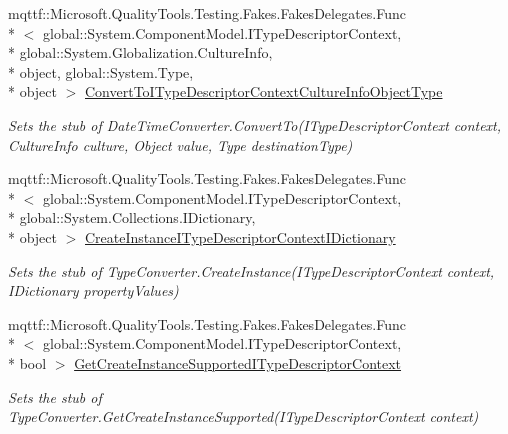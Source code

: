 \begin{DoxyCompactItemize}
mqttf\-::\-Microsoft.\-Quality\-Tools.\-Testing.\-Fakes.\-Fakes\-Delegates.\-Func\\*
$<$ global\-::\-System.\-Component\-Model.\-I\-Type\-Descriptor\-Context, \\*
global\-::\-System.\-Globalization.\-Culture\-Info, \\*
object, global\-::\-System.\-Type, \\*
object $>$ \hyperlink{class_system_1_1_component_model_1_1_fakes_1_1_stub_date_time_converter_a937aa8a7ee9f62cd32cdd3403766e67e}{Convert\-To\-I\-Type\-Descriptor\-Context\-Culture\-Info\-Object\-Type}
\begin{DoxyCompactList}\small\item\em Sets the stub of Date\-Time\-Converter.\-Convert\-To(\-I\-Type\-Descriptor\-Context context, Culture\-Info culture, Object value, Type destination\-Type)\end{DoxyCompactList}\item 
mqttf\-::\-Microsoft.\-Quality\-Tools.\-Testing.\-Fakes.\-Fakes\-Delegates.\-Func\\*
$<$ global\-::\-System.\-Component\-Model.\-I\-Type\-Descriptor\-Context, \\*
global\-::\-System.\-Collections.\-I\-Dictionary, \\*
object $>$ \hyperlink{class_system_1_1_component_model_1_1_fakes_1_1_stub_date_time_converter_aa9df84235bd62164c15cdaead8dda56f}{Create\-Instance\-I\-Type\-Descriptor\-Context\-I\-Dictionary}
\begin{DoxyCompactList}\small\item\em Sets the stub of Type\-Converter.\-Create\-Instance(\-I\-Type\-Descriptor\-Context context, I\-Dictionary property\-Values)\end{DoxyCompactList}\item 
mqttf\-::\-Microsoft.\-Quality\-Tools.\-Testing.\-Fakes.\-Fakes\-Delegates.\-Func\\*
$<$ global\-::\-System.\-Component\-Model.\-I\-Type\-Descriptor\-Context, \\*
bool $>$ \hyperlink{class_system_1_1_component_model_1_1_fakes_1_1_stub_date_time_converter_aa7d4fcd1d339d053bbee299ef14d7976}{Get\-Create\-Instance\-Supported\-I\-Type\-Descriptor\-Context}
\begin{DoxyCompactList}\small\item\em Sets the stub of Type\-Converter.\-Get\-Create\-Instance\-Supported(\-I\-Type\-Descriptor\-Context context)\end{DoxyCompactList}\item 

\end{DoxyCompactItemize}
